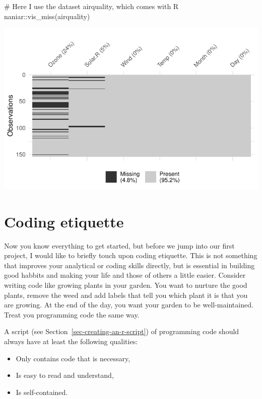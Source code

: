 \documentclass[
  letterpaper,
]{krantz}
\makeatletter
\newenvironment{Shaded}{\begin{snugshade}}{\end{snugshade}}
\newcommand{\CommentTok}[1]{\textcolor[rgb]{0.37,0.37,0.37}{#1}}
\newcommand{\FunctionTok}[1]{\textcolor[rgb]{0.28,0.35,0.67}{#1}}
\newcommand{\NormalTok}[1]{\textcolor[rgb]{0.00,0.23,0.31}{#1}}
\newcommand{\SpecialCharTok}[1]{\textcolor[rgb]{0.37,0.37,0.37}{#1}}
\newenvironment{kframe}{%
\medskip{}
\setlength{\fboxsep}{.8em}
 \def\at@end@of@kframe{}%
 \ifinner\ifhmode%
  \def\at@end@of@kframe{\end{minipage}}%
  \begin{minipage}{\columnwidth}%
 \fi\fi%
 \def\FrameCommand##1{\hskip\@totalleftmargin \hskip-\fboxsep
 \colorbox{shadecolor}{##1}\hskip-\fboxsep
     \hskip-\linewidth \hskip-\@totalleftmargin \hskip\columnwidth}%
 \MakeFramed {\advance\hsize-\width
   \@totalleftmargin\z@ \linewidth\hsize
   \@setminipage}}%
 {\par\unskip\endMakeFramed%
 \at@end@of@kframe}
\renewenvironment{Shaded}{\begin{kframe}}{\end{kframe}}
\makeatother
\begin{document}
\begin{Shaded}
\begin{Highlighting}[]
\CommentTok{\# Here I use the dataset \textquotesingle{}airquality\textquotesingle{}, which comes with R}
\NormalTok{naniar}\SpecialCharTok{::}\FunctionTok{vis\_miss}\NormalTok{(airquality)}
\end{Highlighting}
\end{Shaded}

\includegraphics{05_r_basics_files/figure-pdf/explicitly-calling-functions-1.pdf}

\section{Coding etiquette}\label{sec-coding-etiquette}

Now you know everything to get started, but before we jump into our
first project, I would like to briefly touch upon coding etiquette. This
is not something that improves your analytical or coding skills
directly, but is essential in building good habbits and making your life
and those of others a little easier. Consider writing code like growing
plants in your garden. You want to nurture the good plants, remove the
weed and add labels that tell you which plant it is that you are
growing. At the end of the day, you want your garden to be
well-maintained. Treat you programming code the same way.

A script (see Section~\ref{sec-creating-an-r-script}) of programming
code should always have at least the following qualities:

\begin{itemize}
\item
  Only contains code that is necessary,
\item
  Is easy to read and understand,
\item
  Is self-contained.
\end{itemize}
\end{document}
